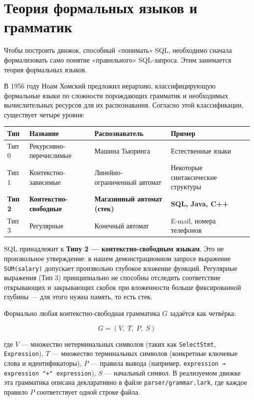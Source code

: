 \documentclass[a4paper,12pt]{report}
\begin{document}
\section{Теория формальных языков и грамматик}

Чтобы построить движок, способный «понимать» SQL, необходимо сначала формализовать само понятие «правильного» SQL-запроса. Этим занимается теория формальных языков.

В 1956 году Ноам Хомский предложил иерархию, классифицирующую формальные языки по сложности порождающих грамматик и необходимых вычислительных ресурсов для их распознавания. Согласно этой классификации, существует четыре уровня:

\begin{longtable}{|l|l|l|l|}
\hline
Тип & Название & Распознаватель & Пример \\ \hline
Тип 0 & Рекурсивно-перечислимые & Машина Тьюринга & Естественные языки \\ \hline
Тип 1 & Контекстно-зависимые & Линейно-ограниченный автомат & Некоторые синтаксические структуры \\ \hline
\textbf{Тип 2} & \textbf{Контекстно-свободные} & \textbf{Магазинный автомат (стек)} & \textbf{SQL, Java, C++} \\ \hline
Тип 3 & Регулярные & Конечный автомат & E-mail, номера телефонов \\ \hline
\end{longtable}

SQL принадлежит к \textbf{Типу 2 — контекстно-свободным языкам}. Это не произвольное утверждение: в нашем демонстрационном запросе выражение \texttt{SUM(salary)} допускает произвольно глубокое вложение функций. Регулярные выражения (Тип 3) принципиально не способны отследить соответствие открывающих и закрывающих скобок при вложенности больше фиксированной глубины — для этого нужна память, то есть стек.

Формально любая контекстно-свободная грамматика $G$ задаётся как четвёрка:

\begin{equation*}
G = (V,\; T,\; P,\; S)
\end{equation*}

где $V$ — множество нетерминальных символов (таких как \texttt{SelectStmt}, \texttt{Expression}), $T$ — множество терминальных символов (конкретные ключевые слова и идентификаторы), $P$ — правила вывода (например, \texttt{expression → expression "+" expression}), $S$ — начальный символ. В реализуемом движке эта грамматика описана декларативно в файле \texttt{parser/grammar.lark}, где каждое правило $P$ соответствует одной строке файла.
\end{document}
